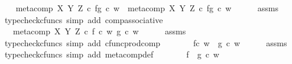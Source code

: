 \begin{isabellebody}
\ \ \isamarkupfalse%
\ {\isachardoublequoteopen}{\isacharparenleft}{\kern0pt}meta{\isacharunderscore}{\kern0pt}comp\ X\ Y\ Z\ {\isasymcirc}\isactrlsub c\ {\isasymlangle}f{\isacharcomma}{\kern0pt}g{\isasymrangle}{\isacharparenright}{\kern0pt}\ {\isasymcirc}\isactrlsub c\ w\ {\isacharequal}{\kern0pt}\ meta{\isacharunderscore}{\kern0pt}comp\ X\ Y\ Z\ {\isasymcirc}\isactrlsub c\ {\isasymlangle}f{\isacharcomma}{\kern0pt}g{\isasymrangle}\ {\isasymcirc}\isactrlsub c\ w{\isachardoublequoteclose}\isanewline
\ \ \ \ \isamarkupfalse%
\ assms\ \isamarkupfalse%
\ {\isacharparenleft}{\kern0pt}typecheck{\isacharunderscore}{\kern0pt}cfuncs{\isacharcomma}{\kern0pt}\ simp\ add{\isacharcolon}{\kern0pt}\ comp{\isacharunderscore}{\kern0pt}associative{}{\isacharparenright}{\kern0pt}\isanewline
\ \ \isamarkupfalse%
\ \isamarkupfalse%
\ {\isachardoublequoteopen}{\isachardot}{\kern0pt}{\isachardot}{\kern0pt}{\isachardot}{\kern0pt}\ {\isacharequal}{\kern0pt}\ meta{\isacharunderscore}{\kern0pt}comp\ X\ Y\ Z\ {\isasymcirc}\isactrlsub c\ {\isasymlangle}f\ {\isasymcirc}\isactrlsub c\ w{\isacharcomma}{\kern0pt}\ g\ {\isasymcirc}\isactrlsub c\ w{\isasymrangle}{\isachardoublequoteclose}\isanewline
\ \ \ \ \isamarkupfalse%
\ assms\ \isamarkupfalse%
\ {\isacharparenleft}{\kern0pt}typecheck{\isacharunderscore}{\kern0pt}cfuncs{\isacharcomma}{\kern0pt}\ simp\ add{\isacharcolon}{\kern0pt}\ cfunc{\isacharunderscore}{\kern0pt}prod{\isacharunderscore}{\kern0pt}comp{\isacharparenright}{\kern0pt}\isanewline
\ \ \isamarkupfalse%
\ \isamarkupfalse%
\ {\isachardoublequoteopen}{\isachardot}{\kern0pt}{\isachardot}{\kern0pt}{\isachardot}{\kern0pt}\ {\isacharequal}{\kern0pt}\ {\isacharparenleft}{\kern0pt}f{\isasymcirc}\isactrlsub c\ w{\isacharparenright}{\kern0pt}\ {\isasymbox}\ {\isacharparenleft}{\kern0pt}g\ {\isasymcirc}\isactrlsub c\ w{\isacharparenright}{\kern0pt}{\isachardoublequoteclose}\isanewline
\ \ \ \ \isamarkupfalse%
\ assms\ \isamarkupfalse%
\ {\isacharparenleft}{\kern0pt}typecheck{\isacharunderscore}{\kern0pt}cfuncs{\isacharcomma}{\kern0pt}\ simp\ add{\isacharcolon}{\kern0pt}\ meta{\isacharunderscore}{\kern0pt}comp{}{\isacharunderscore}{\kern0pt}def{}{\isacharparenright}{\kern0pt}\isanewline
\ \ \isamarkupfalse%
\ \isamarkupfalse%
\ {\isachardoublequoteopen}{\isachardot}{\kern0pt}{\isachardot}{\kern0pt}{\isachardot}{\kern0pt}\ {\isacharequal}{\kern0pt}\ {\isacharparenleft}{\kern0pt}f\ {\isasymbox}\ g{\isacharparenright}{\kern0pt}\ {\isasymcirc}\isactrlsub c\ w{\isachardoublequoteclose}\isanewline

\end{isabellebody}
